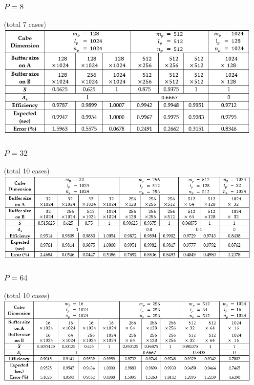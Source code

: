 \documentclass{amsart}
\theoremstyle{definition}
\theoremstyle{remark}
\numberwithin{equation}{section}
\begin{document}
\subsubsection{$P = 8$} (total 7 cases)\\
\includegraphics[scale=0.41]{figures/Experiments_P8.jpg}

\subsubsection{$P = 32$} (total 10 cases)\\
\includegraphics[scale=0.38]{figures/Experiments_P32.jpg}

\subsubsection{$P = 64$} (total 10 cases)\\
\includegraphics[scale=0.38]{figures/Experiments_P64.jpg}
\end{document}
